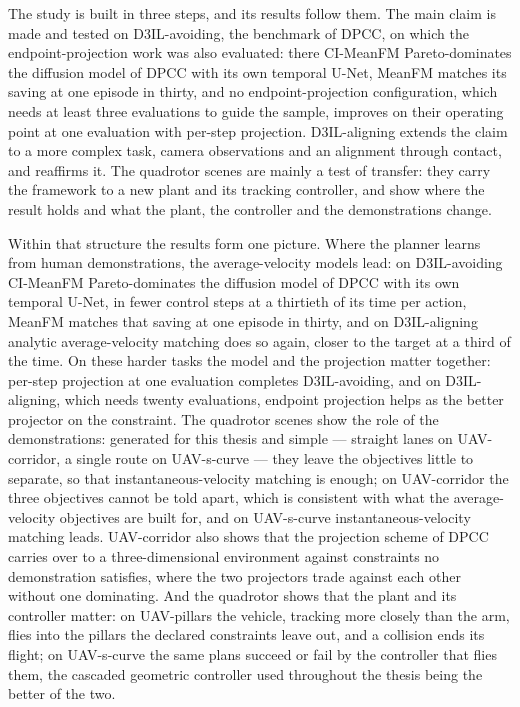 The study is built in three steps, and its results follow them. The main claim is made and tested on
D3IL-avoiding, the benchmark of \ac{DPCC}, on which the endpoint-projection work was also evaluated: there
CI-MeanFM Pareto-dominates the diffusion model of \ac{DPCC} with its own temporal U-Net, MeanFM matches its
saving at one episode in thirty, and no
endpoint-projection configuration, which needs at least three evaluations to guide the sample, improves on their
operating point at one evaluation with per-step projection. D3IL-aligning extends the claim to a more complex
task, camera observations and an alignment through contact, and reaffirms it. The quadrotor scenes are mainly a
test of transfer: they carry the framework to a new plant and its tracking controller, and show where the result
holds and what the plant, the controller and the demonstrations change.

Within that structure the results form one picture. Where the planner learns from human
demonstrations, the average-velocity models lead: on D3IL-avoiding CI-MeanFM Pareto-dominates the diffusion model of
\ac{DPCC} with its own temporal U-Net, in fewer control steps at a thirtieth of its time per action, MeanFM
matches that saving at one episode in thirty, and on
D3IL-aligning analytic average-velocity matching does so again, closer to the target at a third of the time.
On these harder tasks the model and the projection matter together: per-step projection at one evaluation
completes D3IL-avoiding, and on D3IL-aligning, which needs twenty evaluations, endpoint projection helps as the
better projector on the constraint. The quadrotor scenes show the role of the demonstrations: generated for
this thesis and simple --- straight lanes on UAV-corridor, a single route on UAV-s-curve --- they leave the
objectives little to separate, so that instantaneous-velocity matching is enough; on UAV-corridor the three
objectives cannot be told apart, which is consistent with what the average-velocity objectives are built for,
and on
UAV-s-curve instantaneous-velocity matching leads. UAV-corridor also shows that the projection scheme of
\ac{DPCC} carries over to a three-dimensional environment against constraints no demonstration satisfies,
where the two projectors trade against each other without one dominating. And the quadrotor shows that the
plant and its controller matter: on UAV-pillars the vehicle, tracking more closely than the arm, flies into
the pillars the declared constraints leave out, and a collision ends its flight; on UAV-s-curve the same
plans succeed or fail by the controller that flies them, the cascaded geometric controller used throughout the
thesis being the better of the two.

